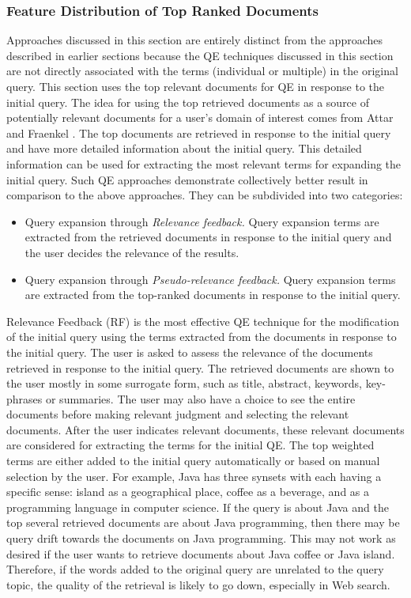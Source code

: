 \subsubsection{Feature Distribution of Top Ranked Documents} \label{sec:3.2.3}
Approaches discussed in this section are entirely distinct from the approaches described in earlier sections because the QE techniques discussed in this section are not directly associated with the terms (individual or multiple) in the original query. This section uses the top relevant documents for QE in response to the initial query. The idea for using the top retrieved documents as a source of potentially relevant documents for a user's domain of interest comes from Attar and Fraenkel \cite{attar1977local}. The top documents are retrieved in response to the initial query and have more detailed information about the initial query. This detailed information can be used for extracting the most relevant terms for expanding the initial query. Such QE approaches demonstrate collectively better result in comparison to the above approaches. They can be subdivided into two categories:
\begin{itemize}
	\item Query expansion through \emph{Relevance feedback.} Query expansion terms are extracted from the retrieved documents in response to the initial query and the user decides the relevance of the results.
	\item Query expansion through \emph{Pseudo-relevance feedback.} Query expansion terms are extracted from the top-ranked documents in response to the initial query.
	
\end{itemize}

Relevance Feedback (RF) is the most effective QE technique for the modification of  the initial query using the terms extracted from the documents in response to the initial query. The user is asked to assess the relevance of the documents retrieved in response to the initial query. The retrieved documents are shown to the user mostly in some surrogate form, such as title, abstract, keywords, key-phrases or summaries. The user may also have a choice to see the entire documents before making relevant judgment and selecting the relevant documents. After the user indicates relevant documents,  these relevant documents are considered for extracting the terms for the initial QE. The top weighted terms are either added to the initial query automatically or based on manual selection by the user. For example, Java has three synsets with each having a specific sense: island as a geographical place, coffee as a beverage, and as a programming language in computer science. If the query is about Java and the top several retrieved documents are about Java programming, then there may be query drift towards the documents on Java programming. This may not work as desired if the user wants to retrieve documents about Java coffee or Java island. Therefore, if the words added to the original query are unrelated to the query topic, the quality of the retrieval is likely to go down, especially in Web search.

